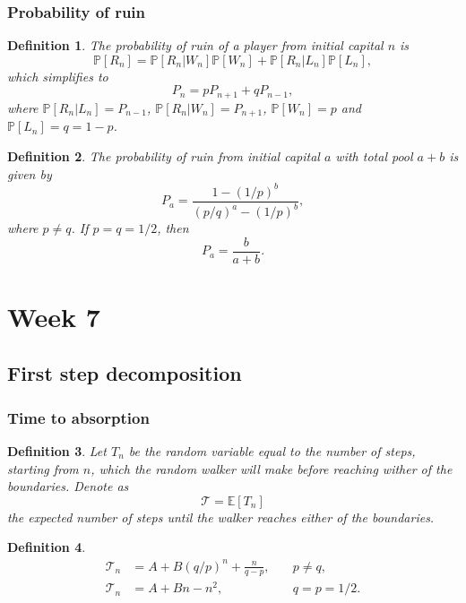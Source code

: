 \documentclass{article}
\newtheorem{definition}{Definition}
\newcommand{\Prob}{\mathbb{P}}
\newcommand{\E}{\mathbb{E}}
\newcommand{\MT}{\mathcal{T}}
\begin{document}
\subsubsection{Probability of ruin}
\begin{definition}
The probability of ruin of a player from initial capital $n$ is
    \begin{equation}
        \Prob[R_n] = \Prob[R_n\vert W_n]\Prob[W_n] + \Prob[R_n\vert L_n]\Prob[L_n],
    \end{equation}
    which simplifies to
    \begin{equation}
        P_n = pP_{n+1} +qP_{n-1},
    \end{equation}
    where $\Prob[R_n\vert L_n]=P_{n-1}$, $\Prob[R_n\vert W_n]=P_{n+1}$, $\Prob[W_n]=p$ and $\Prob[L_n]=q=1-p$. 
\end{definition}
\begin{definition}
    The probability of ruin from initial capital $a$ with total pool $a+b$ is given by
    \begin{equation}
        P_a=\frac{1-(1/p)^b}{(p/q)^a-(1/p)^b},
    \end{equation}
    where $p\neq q$. If $p=q=1/2$, then
    \begin{equation}
        P_a = \frac{b}{a+b}.
    \end{equation}
\end{definition}

\section{Week 7}
\subsection{First step decomposition}
\subsubsection{Time to absorption}
\begin{definition}
    Let $T_n$ be the random variable equal to the number of steps, starting from $n$, which the random walker will make before reaching wither of the boundaries. Denote as
    \begin{equation}
        \MT = \E[T_n] \nonumber
    \end{equation}
    the expected number of steps until the walker reaches either of the boundaries.
\end{definition}
\begin{definition}
    \begin{align}
        \MT_n &= A+B(q/p)^n+\frac{n}{q-p},\quad &p\neq q, \\
        \MT_n &= A+Bn-n^2,\quad &q=p=1/2.
    \end{align}
\end{definition}
\end{document}
